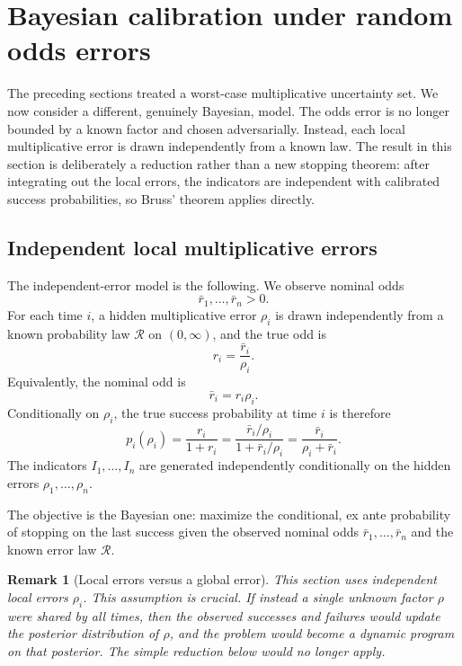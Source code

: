 \documentclass[11pt,a4paper]{article}
\newtheorem{remark}{Remark}
\begin{document}
\section{Bayesian calibration under random odds errors}
\label{sec:bayes-random-errors}

The preceding sections treated a worst-case multiplicative uncertainty set.  We
now consider a different, genuinely Bayesian, model.  The odds error is no
longer bounded by a known factor and chosen adversarially.  Instead, each local
multiplicative error is drawn independently from a known law.  The result in this
section is deliberately a reduction rather than a new stopping theorem: after
integrating out the local errors, the indicators are independent with calibrated
success probabilities, so Bruss' theorem applies directly.

\subsection{Independent local multiplicative errors}

The independent-error model is the following.  We observe nominal odds
\[
  \bar r_1,\dots,\bar r_n>0.
\]
For each time $i$, a hidden multiplicative error $\rho_i$ is drawn independently
from a known probability law $\mathcal R$ on $(0,\infty)$, and the true odd is
\[
  \boxed{
  r_i=\frac{\bar r_i}{\rho_i}.
  }
  \tag{12}
\]
Equivalently, the nominal odd is
\[
  \bar r_i=r_i\rho_i.
\]
Conditionally on $\rho_i$, the true success probability at time $i$ is therefore
\[
  p_i(\rho_i)
  =\frac{r_i}{1+r_i}
  =\frac{\bar r_i/\rho_i}{1+\bar r_i/\rho_i}
  =\frac{\bar r_i}{\rho_i+\bar r_i}.
\]
The indicators $I_1,\dots,I_n$ are generated independently conditionally on the
hidden errors $\rho_1,
\dots,\rho_n$.

The objective is the Bayesian one: maximize the conditional, ex ante probability
of stopping on the last success given the observed nominal odds
$\bar r_1,
\dots,\bar r_n$ and the known error law $\mathcal R$.

\begin{remark}[Local errors versus a global error]
This section uses independent local errors $\rho_i$.  This assumption is crucial.
If instead a single unknown factor $\rho$ were shared by all times, then the
observed successes and failures would update the posterior distribution of
$\rho$, and the problem would become a dynamic program on that posterior.  The
simple reduction below would no longer apply.
\end{remark}
\end{document}
